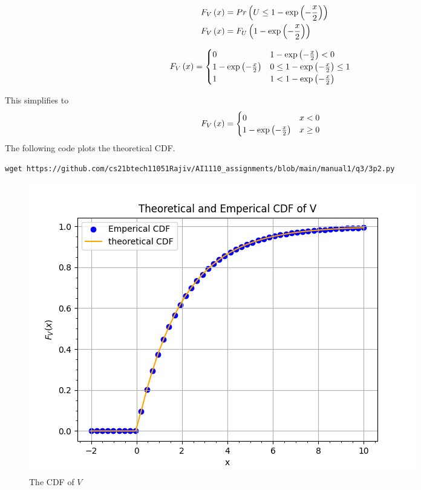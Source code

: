 \documentclass[journal,12pt,twocolumn]{IEEEtran}
\renewcommand\thesection{\arabic{section}}
\begin{document}
\begin{enumerate}[label=\thesection.\arabic*
,ref=\thesection.\theenumi]
\begin{align}
	F_V\left(x\right) &= Pr\left(U \le 1- \exp{\ensuremath{\left(-\frac{x}{2}\right)} }\right) \\
	F_V\left(x\right) &= F_U\left(1- \exp{\ensuremath{\left(-\frac{x}{2}\right)} }\right)		
\end{align}
\begin{small}
\begin{align}
	F_V\left(x\right) &=
    \begin{cases}  
        0 & 1- \exp{\ensuremath{\left(-\frac{x}{2}\right)} } < 0\\
        1- \exp{\ensuremath{\left(-\frac{x}{2}\right)} } & 0 \le 1- \exp{\ensuremath{\left(-\frac{x}{2}\right)} } \le 1 \\
        1 & 1 < 1- \exp{\ensuremath{\left(-\frac{x}{2}\right)} }
    \end{cases}
\end{align}
\end{small}
This simplifies to
\begin{align}
	F_V\left(x\right) &=
    \begin{cases}  
        0 & x < 0\\
        1- \exp{\ensuremath{\left(-\frac{x}{2}\right)}} & x \ge 0
    \end{cases}
    \label{eq:F_V}
\end{align}
The following code plots the theoretical CDF.
\begin{lstlisting}
wget https://github.com/cs21btech11051Rajiv/AI1110_assignments/blob/main/manual1/q3/3p2.py
\end{lstlisting}
\begin{figure}[ht!]
\centering
\includegraphics[width=\columnwidth]{./figs/fig3.2.png}
\caption{The CDF of $V$}
\label{fig:theory_misc_cdf}
\end{figure}

\end{enumerate}
\end{document}
